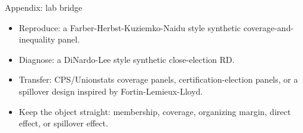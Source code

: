 \documentclass[aspectratio=169,11pt]{beamer}
\begin{document}
\appendix

\begin{frame}{Appendix: lab bridge}
\begin{itemize}
    \item Reproduce: a Farber-Herbst-Kuziemko-Naidu style synthetic coverage-and-inequality panel.
    \item Diagnose: a DiNardo-Lee style synthetic close-election RD.
    \item Transfer: CPS/Unionstats coverage panels, certification-election panels, or a spillover design inspired by Fortin-Lemieux-Lloyd.
    \item Keep the object straight: membership, coverage, organizing margin, direct effect, or spillover effect.
\end{itemize}
\end{frame}
\end{document}
